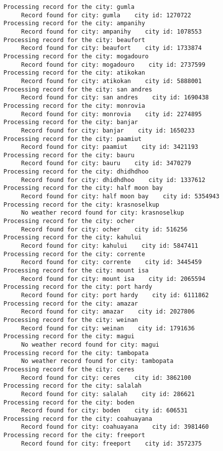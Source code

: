 \documentclass[11pt]{article}
\begin{document}
\begin{Verbatim}[commandchars=\\\{\}]
Processing record for the city: gumla
     Record found for city: gumla    city id: 1270722
Processing record for the city: ampanihy
     Record found for city: ampanihy    city id: 1078553
Processing record for the city: beaufort
     Record found for city: beaufort    city id: 1733874
Processing record for the city: mogadouro
     Record found for city: mogadouro    city id: 2737599
Processing record for the city: atikokan
     Record found for city: atikokan    city id: 5888001
Processing record for the city: san andres
     Record found for city: san andres    city id: 1690438
Processing record for the city: monrovia
     Record found for city: monrovia    city id: 2274895
Processing record for the city: banjar
     Record found for city: banjar    city id: 1650233
Processing record for the city: paamiut
     Record found for city: paamiut    city id: 3421193
Processing record for the city: bauru
     Record found for city: bauru    city id: 3470279
Processing record for the city: dhidhdhoo
     Record found for city: dhidhdhoo    city id: 1337612
Processing record for the city: half moon bay
     Record found for city: half moon bay    city id: 5354943
Processing record for the city: krasnoselkup
     No weather record found for city: krasnoselkup
Processing record for the city: ocher
     Record found for city: ocher    city id: 516256
Processing record for the city: kahului
     Record found for city: kahului    city id: 5847411
Processing record for the city: corrente
     Record found for city: corrente    city id: 3445459
Processing record for the city: mount isa
     Record found for city: mount isa    city id: 2065594
Processing record for the city: port hardy
     Record found for city: port hardy    city id: 6111862
Processing record for the city: amazar
     Record found for city: amazar    city id: 2027806
Processing record for the city: weinan
     Record found for city: weinan    city id: 1791636
Processing record for the city: magui
     No weather record found for city: magui
Processing record for the city: tambopata
     No weather record found for city: tambopata
Processing record for the city: ceres
     Record found for city: ceres    city id: 3862100
Processing record for the city: salalah
     Record found for city: salalah    city id: 286621
Processing record for the city: boden
     Record found for city: boden    city id: 606531
Processing record for the city: coahuayana
     Record found for city: coahuayana    city id: 3981460
Processing record for the city: freeport
     Record found for city: freeport    city id: 3572375

\end{Verbatim}
\end{document}
